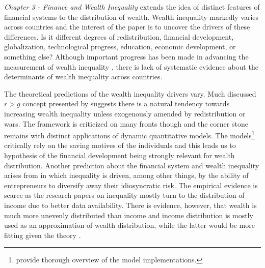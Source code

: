 \begin{refsection}
\emph{Chapter 3 - Finance and Wealth Inequality} extends the idea of distinct features of financial systems to the distribution of wealth. Wealth inequality markedly varies across countries \parencite{daviesetal2017} and the interest of the paper is to uncover the drivers of these differences. Is it different degrees of redistribution, financial development, globalization, technological progress, education, economic development, or something else? Although important progress has been made in advancing the measurement of wealth inequality \parencite{daviesetal2017,SaezZucman2016}, there is lack of systematic evidence about the determinants of wealth inequality across countries.

The theoretical predictions of the wealth inequality drivers vary. Much discussed $r > g$ concept presented by \textcite{piketty2014} suggests there is a natural tendency towards increasing wealth inequality unless exogenously amended by redistribution or wars. The framework is criticized on many fronts though \parencite{mankiw2015yes,blume2015capital,king2017literature} and the corner stone remains with distinct applications of dynamic quantitative models. The models\footnote{\textcite{DENARDI2017280} provide thorough overview of the model implementations.} critically rely on the saving motives of the individuals and this leads us to hypothesis of the financial development being strongly relevant for wealth distribution. Another prediction about the financial system and wealth inequality arises from \textcite{pastor2016income} in which inequality is driven, among other things, by the ability of entrepreneurs to diversify away their idiosyncratic risk. The empirical evidence is scarce as the research papers on inequality mostly turn to the distribution of income due to better data availability. There is evidence, however, that wealth is much more unevenly distributed than income \textcite{zucman2019,oecd2013crisis} and income distribution is mostly used as an approximation of wealth distribution, while the latter would be more fitting given the theory \parencite{bagchi2015does}.


\end{refsection}
